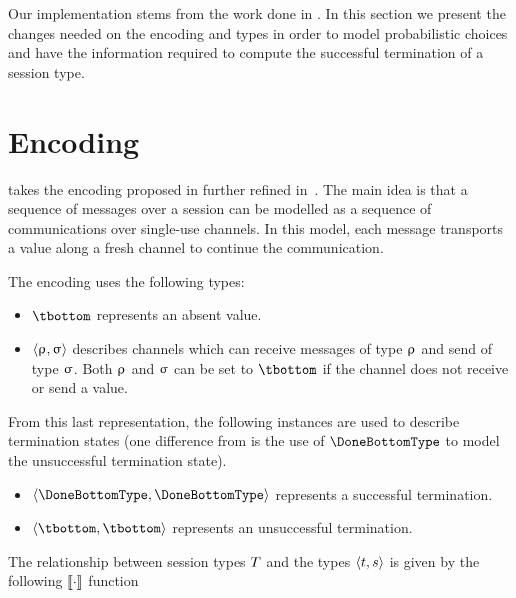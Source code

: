 Our implementation stems from the work done in \FuSe. In this section we present
the changes needed on the encoding and types in order to model probabilistic
choices and have the information required to compute the successful termination
of a session type.

\section{Encoding}

\FuSe takes the encoding proposed in \cite{Dardha} further refined
in~\cite{DBLP:journals/jfp/Padovani17}. The main idea is that a sequence of
messages over a session can be modelled as a sequence of communications over
single-use channels. In this model, each message transports a value along a
fresh channel to continue the communication.

The encoding uses the following types:

\begin{itemize}
	\item $\tbottom$ represents an absent value.
	\item $\langle\uprho_{},\upsigma_{}\rangle$ describes channels which can
		receive messages of type $\uprho_{}$ and send of type $\upsigma_{}$. Both
		$\uprho_{}$ and $\upsigma_{}$ can be set to $\tbottom$ if the channel does not
		receive or send a value.
\end{itemize}

From this last representation, the following instances are used to describe
termination states (one difference from \FuSe is the use of $\DoneBottomType$ to
model the unsuccessful termination state).

\begin{itemize}
	\item $\tsession{\DoneBottomType}{\DoneBottomType}$ represents a successful
	termination.
	\item $\tsession{\tbottom}{\tbottom}$ represents an unsuccessful
	termination.
\end{itemize}

The relationship between session types $T$ and the types
$\langle t,s\rangle$ is given by the following $\llbracket\cdot\rrbracket$ function

